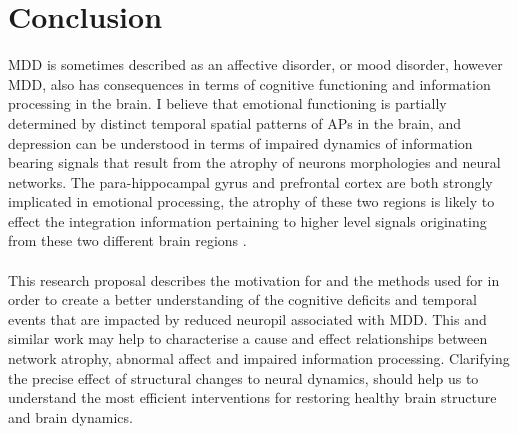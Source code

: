 \documentclass[a4paper,11pt]{article}
\begin{document}
\section{Conclusion} 
MDD is sometimes described as an affective disorder, or mood disorder, however MDD, also has consequences in terms of cognitive functioning and information processing in the brain. I believe that emotional functioning is partially determined by distinct temporal spatial patterns of APs in the brain, and depression can be understood in terms of impaired dynamics of information bearing signals that result from the atrophy of neurons morphologies and neural networks. The para-hippocampal gyrus and prefrontal cortex are both strongly implicated in emotional processing, the atrophy of these two regions is likely to effect the integration information pertaining to higher level signals originating from these two different brain regions \cite{sarasso2014quantifying}
\cite{tononi1998consciousness}.\\
\\
This research proposal describes the motivation for and the methods used for in order to create a better understanding of the cognitive deficits and temporal events that are impacted by reduced neuropil associated with MDD. This and similar work may help to characterise a cause and effect relationships between network atrophy, abnormal affect and impaired information processing. Clarifying the precise effect of structural changes to neural dynamics, should help us to understand the most efficient interventions for restoring healthy brain structure and brain dynamics.\\



\end{document}
